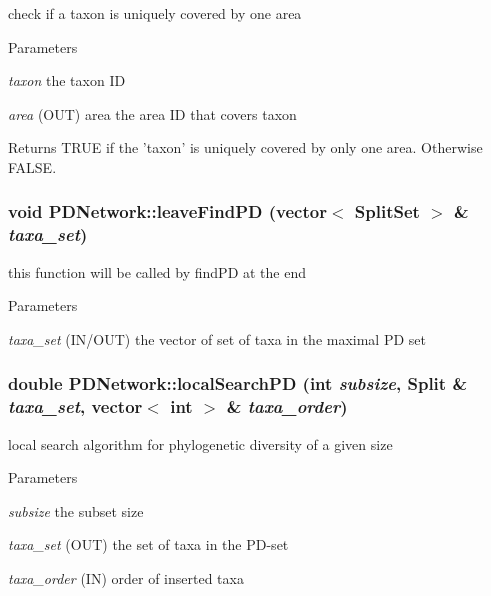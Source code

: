 \label{classPDNetwork_a89a41e4b180dacd776a0496cb4137080}
check if a taxon is uniquely covered by one area 
\begin{DoxyParams}{Parameters}
\item[{\em taxon}]the taxon ID \item[{\em area}](OUT) area the area ID that covers taxon \end{DoxyParams}
\begin{DoxyReturn}{Returns}
TRUE if the 'taxon' is uniquely covered by only one area. Otherwise FALSE. 
\end{DoxyReturn}
\hypertarget{classPDNetwork_a22260c3a934e8f657451066bb45d9ce2}{
\subsubsection[{leaveFindPD}]{\setlength{\rightskip}{0pt plus 5cm}void PDNetwork::leaveFindPD (vector$<$ {\bf SplitSet} $>$ \& {\em taxa\_\-set})}}
\label{classPDNetwork_a22260c3a934e8f657451066bb45d9ce2}
this function will be called by findPD at the end 
\begin{DoxyParams}{Parameters}
\item[{\em taxa\_\-set}](IN/OUT) the vector of set of taxa in the maximal PD set \end{DoxyParams}
\hypertarget{classPDNetwork_afad7cba535aee59bb8b96542cb195e35}{
\subsubsection[{localSearchPD}]{\setlength{\rightskip}{0pt plus 5cm}double PDNetwork::localSearchPD (int {\em subsize}, \/  {\bf Split} \& {\em taxa\_\-set}, \/  vector$<$ int $>$ \& {\em taxa\_\-order})}}
\label{classPDNetwork_afad7cba535aee59bb8b96542cb195e35}
local search algorithm for phylogenetic diversity of a given size 
\begin{DoxyParams}{Parameters}
\item[{\em subsize}]the subset size \item[{\em taxa\_\-set}](OUT) the set of taxa in the PD-\/set \item[{\em taxa\_\-order}](IN) order of inserted taxa \end{DoxyParams}
